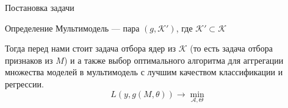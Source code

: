 \documentclass{beamer}
\begin{document}

\begin{frame}{Постановка задачи}

    \begin{block}{Определение}
        Мультимодель --- пара $(g, \mathcal{K'})$, где $\mathcal{K'} \subset \mathcal{K}$
    \end{block}
Тогда перед нами стоит задача отбора ядер из $\mathcal{K}$ (то есть задача
отбора признаков из $M$) и а также выбор оптимального алгоритма для аггрегации
множества моделей в мультимодель с лучшим качеством классификации и регрессии.
$$
    L(y, g(M, \theta)) \to \min_{\mathcal{A}, \Theta}
$$
\end{frame}

\end{document}
